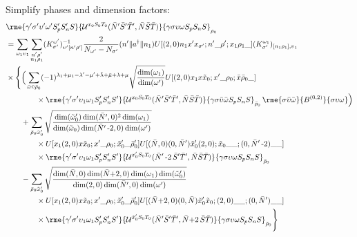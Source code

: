 \documentclass[%
  aps,%
  prc,%
  showpacs,%
  superscriptaddress,%
  onecolumn,%
  notitlepage,%
  11pt,%
  floatfix,%
  amsmath,%
  amssymb,%
]{revtex4-2}
\newcommand{\negative}{\,\text{-}}
\newcommand{\plus}{\text{+}}
\begin{document}
Simplify phases and dimension factors:
\begin{align*}
  &
  \rme{\gamma'\sigma'\upsilon'\omega'S_p'S_n'S}{\mathcal{U}^{x_0 S_0 T_0}(\bar{N}'\bar{S}'\bar{T}',\bar{N}\bar{S}\bar{T})}{\gamma\sigma\upsilon\omega S_p S_n S}_{\rho_0}\\
  &=\sum_{\omega_1\upsilon_1} \sum_{\substack{n'\rho'\\n_1\rho_1}}(K_{\sigma'}^{\omega'})_{\upsilon'[n'\rho']}^{-1}\frac{2}{N_{\omega'} - N_{\sigma'}}(n'\Vert{}a^\dagger\Vert{}n_1) U[(2,0)n_1 x' x_{\sigma'};n'\_\rho';x_1\rho_1\_](K_{\sigma'}^{\omega_1})_{[n_1\rho_1],\upsilon_1}\\
  &\times\Bigg\{\Big(\sum_{\bar{\omega}\bar{\upsilon}\bar{\rho}_0}
      (-1)^{\lambda_1+\mu_1-\lambda'-\mu'+\bar{\lambda}+\bar{\mu}+\lambda+\mu}
      \sqrt{\frac{\dim(\omega_1)}{\dim(\omega')}}
      U[(2,0) x_1 x \tilde{x}_0; x' \_ \rho_0; \bar{x}\bar{\rho}_0\_]
      \\
      & \qquad \qquad \times
      \rme{\gamma'\sigma'\upsilon_1\omega_1 S_p' S_n' S'}{\mathcal{U}^{x_0S_0T_0}(\bar{N}'\bar{S}'\bar{T}',\bar{N}\bar{S}\bar{T})}{\gamma \sigma \bar{\upsilon}\bar{\omega} S_p S_n S}_{\bar{\rho}_0} \, \rme{\sigma \bar{\upsilon}\bar{\omega}}{B^{(0,2)}}{\sigma \upsilon \omega}
    \Big)\\
  &\qquad+\sum_{\bar{\rho}_0\tilde{\omega}_0'}
  \sqrt{\frac{\dim(\tilde{\omega}_0')\dim(\bar{N}',0)^2\dim(\omega_1)}{\dim(\tilde{\omega}_0)\dim(\bar{N}'\negative2,0)\dim(\omega')}}\\
  & \qquad \qquad \times
  U[x_1 (2,0) x \tilde{x}_0; x'\_\rho_0;\tilde{x}_0'\_\bar{\rho}_0']
  U[(\bar{N},0) (0,\bar{N}') \tilde{x}_0' (2,0);\tilde{x}_0\_\_;(0,\bar{N}'\negative2)\_\_]
  \\
  & \qquad \qquad \times
  \rme{\gamma'\sigma'\upsilon_1\omega_1 S_p' S_n' S'}{\mathcal{U}^{x_0'S_0T_0}(\bar{N}'\negative2\,\bar{S}'\bar{T}',\bar{N}\bar{S}\bar{T})}{\gamma \sigma \upsilon \omega S_p S_n S}_{\bar{\rho}_0}\\
  &\qquad-\sum_{\bar{\rho}_0\tilde{\omega}_0'}
  \sqrt{\frac{\dim(\bar{N},0)\dim(\bar{N}\plus2,0)\dim(\omega_1)\dim(\tilde{\omega}_0')}{\dim(2,0)\dim(\bar{N}',0)\dim(\omega')}}\\
  & \qquad \qquad \times
  U[x_1 (2,0) x \tilde{x}_0; x'\_\rho_0;\tilde{x}_0'\_\bar{\rho}_0']
  U[(\bar{N}\plus2,0)(0,\bar{N}) \tilde{x}_0' \tilde{x}_0;(2,0)\_\_;(0,\bar{N}')\_\_]
  \\
  & \qquad \qquad \times
  \rme{\gamma'\sigma'\upsilon_1\omega_1S_p'S_n'S'}{\mathcal{U}^{\tilde{x}_0' S_0 T_0}(\bar{N}'\bar{S}'\bar{T}',\bar{N}\plus2\,\bar{S}\bar{T})}{\gamma \sigma \upsilon \omega S_p S_n S}_{\bar{\rho}_0}
  \Bigg\}
\end{align*}
\clearpage
\end{document}
